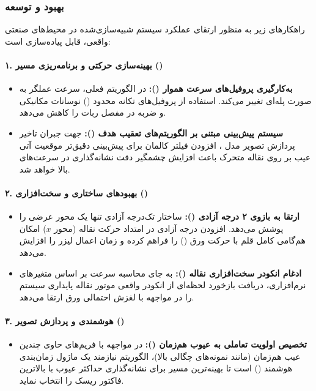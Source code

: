 \documentclass[a4paper, 10pt, twocolumn]{article}
\begin{document}
	\subsubsection*{بهبود و توسعه}
	راهکارهای زیر به منظور ارتقای عملکرد سیستم شبیه‌سازی‌شده در محیط‌های صنعتی واقعی، قابل پیاده‌سازی است:
	\paragraph{۱. بهینه‌سازی حرکتی و برنامه‌ریزی مسیر ()}
	\begin{itemize}
		\item \textbf{به‌کارگیری پروفیل‌های سرعت هموار ():} در الگوریتم فعلی، سرعت عملگر به صورت پله‌ای تغییر می‌کند. استفاده از پروفیل‌های تکانه محدود () نوسانات مکانیکی و ضربه در مفصل ربات را کاهش می‌دهد.
		\item \textbf{سیستم پیش‌بینی مبتنی بر الگوریتم‌های تعقیب هدف ():} جهت جبران تاخیر پردازش تصویر مدل ، افزودن فیلتر کالمان برای پیش‌بینی دقیق‌تر موقعیت آتی عیب بر روی نقاله متحرک باعث افزایش چشمگیر دقت نشانه‌گذاری در سرعت‌های بالا خواهد شد.
	\end{itemize} 
	\paragraph{۲. بهبودهای ساختاری و سخت‌افزاری ()} 
	\begin{itemize}
		\item \textbf{ارتقا به بازوی ۲ درجه آزادی ():} ساختار تک‌درجه آزادی تنها یک محور عرضی را پوشش می‌دهد. افزودن درجه آزادی در امتداد حرکت نقاله (محور $x$) امکان هم‌گامی کامل قلم با حرکت ورق () را فراهم کرده و زمان اعمال لیزر را افزایش می‌دهد.
		\item \textbf{ادغام انکودر سخت‌افزاری نقاله ():} به جای محاسبه سرعت بر اساس متغیرهای نرم‌افزاری، دریافت بازخورد لحظه‌ای از انکودر واقعی موتور نقاله پایداری سیستم را در مواجهه با لغزش احتمالی ورق ارتقا می‌دهد.
	\end{itemize} 
	\paragraph{۳. هوشمندی و پردازش تصویر ()}  
	\begin{itemize}\item \textbf{تخصیص اولویت تعاملی به عیوب هم‌زمان ():} در مواجهه با فریم‌های حاوی چندین عیب هم‌زمان (مانند نمونه‌های چگالی بالا)، الگوریتم نیازمند یک ماژول زمان‌بندی هوشمند () است تا بهینه‌ترین مسیر برای نشانه‌گذاری حداکثر عیوب با بالاترین فاکتور ریسک را انتخاب نماید.\end{itemize}
	
\end{document}
